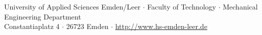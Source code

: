 \begin{titlepage}
    \vspace{1cm}
    \small
    \begin{center}
        University of Applied Sciences Emden/Leer $\cdot$ 
        Faculty of Technology $\cdot$ 
        Mechanical Engineering Department \\
        Constantiaplatz 4 $\cdot$ 
        26723 Emden $\cdot$ 
        \url{http://www.hs-emden-leer.de}
    \end{center}
    
\end{titlepage}
